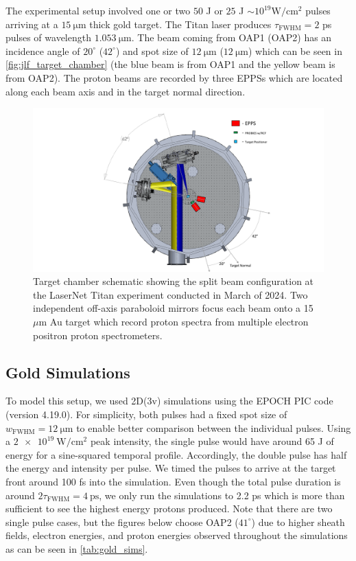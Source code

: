 The experimental setup involved one or two $50$ J or $25$ J $\sim 10^{19} \unit{\watt \per \centi \meter \squared}$ pulses arriving at a $\SI{15}{\micro \meter}$ thick gold target. The Titan laser produces $\tau_\text{FWHM} = 2$ ps pulses of wavelength $\SI{1.053}{\micro \meter}$. The beam coming from \gls{OAP}1 (\gls{OAP}2) has an incidence angle of $20^\circ$ ($42^\circ$) and spot size of $\SI{12}{\micro \meter}$ ($\SI{12}{\micro \meter}$) which can be seen in \autoref{fig:jlf_target_chamber} (the blue beam is from OAP1 and the yellow beam is from OAP2). The proton beams are recorded by three \gls{EPPS}s which are located along each beam axis and in the target normal direction.

\begin{figure}
	\centering
	\includegraphics[width=.95\linewidth]{planning/images/titan/target_area_JLF.pdf}
	\caption{Target chamber schematic showing the split beam configuration at the LaserNet Titan experiment conducted in March of 2024. Two independent off-axis paraboloid mirrors focus each beam onto a 15~$\mu$m Au target which record proton spectra from multiple electron positron proton spectrometers.}
	\label{fig:jlf_target_chamber}
\end{figure}

\subsection{Gold Simulations}

To model this setup, we used 2D(3v) simulations using the EPOCH \gls{PIC} code (version 4.19.0). For simplicity, both pulses had a fixed spot size of $w_\text{FWHM} = \SI{12}{\micro \meter}$ to enable better comparison between the individual pulses. Using a $\SI{2e19}{\watt \per \centi \meter \squared}$ peak intensity, the single pulse would have around 65 J of energy for a sine-squared temporal profile. Accordingly, the double pulse has half the energy and intensity per pulse. We timed the pulses to arrive at the target front around 100 fs into the simulation. Even though the total pulse duration is around $2 \tau_\text{FWHM} = \SI{4}{\pico \second}$, we only run the simulations to 2.2 ps which is more than sufficient to see the highest energy protons produced. Note that there are two single pulse cases, but the figures below choose \gls{OAP}2 ($41^\circ$) due to higher sheath fields, electron energies, and proton energies observed throughout the simulations as can be seen in \autoref{tab:gold_sims}.

